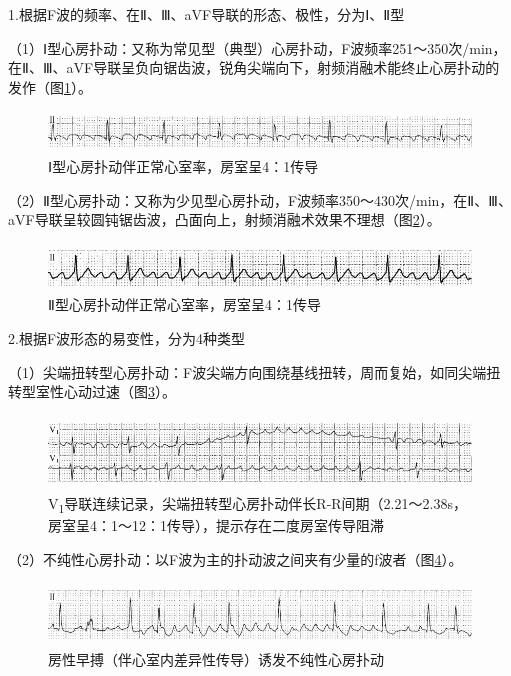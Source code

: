 1.根据F波的频率、在Ⅱ、Ⅲ、aVF导联的形态、极性，分为Ⅰ、Ⅱ型

（1）Ⅰ型心房扑动：又称为常见型（典型）心房扑动，F波频率251～350次/min，在Ⅱ、Ⅲ、aVF导联呈负向锯齿波，锐角尖端向下，射频消融术能终止心房扑动的发作（图\ref{fig13-1}）。

\begin{figure}[!htbp]
 \centering
 \includegraphics[width=5.58333in,height=0.42708in]{./images/Image00209.jpg}
 \captionsetup{justification=centering}
 \caption{Ⅰ型心房扑动伴正常心室率，房室呈4：1传导}
 \label{fig13-1}
  \end{figure} 

（2）Ⅱ型心房扑动：又称为少见型心房扑动，F波频率350～430次/min，在Ⅱ、Ⅲ、aVF导联呈较圆钝锯齿波，凸面向上，射频消融术效果不理想（图\ref{fig13-2}）。

\begin{figure}[!htbp]
 \centering
 \includegraphics[width=5.58333in,height=0.48958in]{./images/Image00210.jpg}
 \captionsetup{justification=centering}
 \caption{Ⅱ型心房扑动伴正常心室率，房室呈4：1传导}
 \label{fig13-2}
  \end{figure} 

2.根据F波形态的易变性，分为4种类型

（1）尖端扭转型心房扑动：F波尖端方向围绕基线扭转，周而复始，如同尖端扭转型室性心动过速（图\ref{fig13-3}）。

\begin{figure}[!htbp]
 \centering
 \includegraphics[width=5.58333in,height=0.77083in]{./images/Image00211.jpg}
 \captionsetup{justification=centering}
 \caption{V\textsubscript{1}导联连续记录，尖端扭转型心房扑动伴长R-R间期（2.21～2.38s，房室呈4：1～12：1传导），提示存在二度房室传导阻滞}
 \label{fig13-3}
  \end{figure} 


（2）不纯性心房扑动：以F波为主的扑动波之间夹有少量的f波者（图\ref{fig13-4}）。

\begin{figure}[!htbp]
 \centering
 \includegraphics[width=5.58333in,height=0.64583in]{./images/Image00212.jpg}
 \captionsetup{justification=centering}
 \caption{房性早搏（伴心室内差异性传导）诱发不纯性心房扑动}
 \label{fig13-4}
  \end{figure} 

